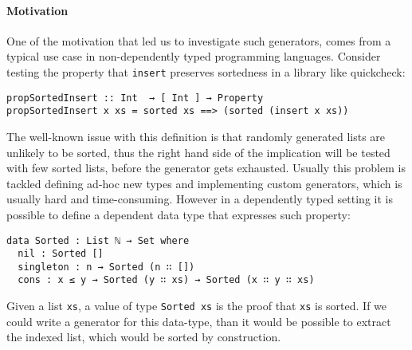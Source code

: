 \documentclass[10pt,a4paper]{article}
\begin{document}
\paragraph{Motivation}
One of the motivation that led us to investigate such generators, comes from a typical use case in non-dependently typed programming languages. Consider  testing the property that \texttt{insert} preserves sortedness in a library like quickcheck:
\begin{verbatim}
propSortedInsert :: Int  → [ Int ] → Property
propSortedInsert x xs = sorted xs ==> (sorted (insert x xs))
\end{verbatim}
The well-known issue with this definition is that randomly generated lists are unlikely to be sorted, thus the right hand side of the implication will be tested with few sorted lists, before the generator gets exhausted.
Usually this problem is tackled defining ad-hoc new types and implementing custom generators, which is usually hard and time-consuming.
However in a dependently typed setting it is possible to define a dependent data type that expresses such property:
\begin{verbatim}
data Sorted : List ℕ → Set where
  nil : Sorted []
  singleton : n → Sorted (n ∷ []) 
  cons : x ≤ y → Sorted (y ∷ xs) → Sorted (x ∷ y ∷ xs)
\end{verbatim}
Given a list \texttt{xs}, a value of type \texttt{Sorted xs} is the proof that \texttt{xs} is sorted.
If we could write a generator for this data-type, than it would be possible to extract the indexed list, which would be sorted by construction.
\end{document}
